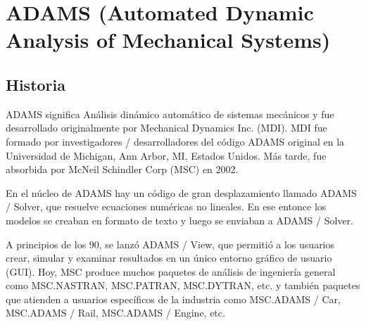     \newpage

\section{ADAMS (Automated Dynamic Analysis of Mechanical Systems)}

    
    \subsection{Historia}
    ADAMS significa Análisis dinámico automático de sistemas mecánicos y fue desarrollado originalmente por Mechanical Dynamics
    Inc. (MDI). MDI fue formado por investigadores / desarrolladores del código ADAMS original en la Universidad de Michigan, Ann
    Arbor, MI, Estados Unidos. Más tarde, fue absorbida por McNeil Schindler Corp (MSC) en 2002.
    
    En el núcleo de ADAMS hay un código de gran desplazamiento llamado ADAMS / Solver, que resuelve ecuaciones numéricas no lineales.
    En ese entonce los modelos se creaban en formato de texto y luego se enviaban a ADAMS / Solver. 
    
    A principios de los 90, se lanzó ADAMS / View, que permitió a los usuarios crear, simular y examinar resultados en un único entorno gráfico de usuario (GUI). Hoy, MSC produce
    muchos paquetes de análisis de ingeniería general como MSC.NASTRAN, MSC.PATRAN, MSC.DYTRAN, etc. y también paquetes
    que atienden a usuarios específicos de la industria como MSC.ADAMS / Car, MSC.ADAMS / Rail, MSC.ADAMS / Engine, etc.
    
